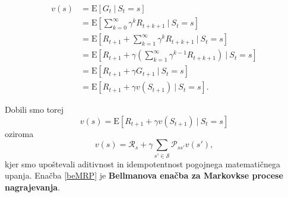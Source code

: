 \documentclass[12pt,a4paper]{amsart}
\theoremstyle{definition} %
\theoremstyle{plain} %
\begin{document}
\begin{align*}
    v(s) &= \mathrm{E} [G_t~|~S_t = s] \\
         &= \mathrm{E} [\sum_{k=0}^\infty \gamma^k R_{t + k + 1}~|~S_t = s] \\
         &= \mathrm{E} [R_{t+1} + \sum_{k=1}^\infty \gamma^k R_{t + k + 1}~|~S_t = s] \\
         &= \mathrm{E} [R_{t+1} + \gamma(\sum_{k=1}^\infty \gamma^{k-1} R_{t + k + 1})~|~S_t = s] \\
         &= \mathrm{E} [R_{t+1} + \gamma G_{t+1}~|~S_t = s] \\
         &= \mathrm{E} [R_{t+1} + \gamma v(S_{t+1})~|~S_t = s].
\end{align*}

Dobili smo torej 
$$
v(s) = \mathrm{E} [R_{t+1} + \gamma v(S_{t+1})~|~S_t = s]
$$
oziroma 
\begin{equation}\label{beMRP}
    v(s) = \mathcal{R}_s + \gamma \sum_{s' \in \mathcal{S}} \mathcal{P}_{ss'} v(s'),
\end{equation} 
kjer smo upoštevali aditivnost in idempotentnost pogojnega matematičnega upanja. Enačba \eqref{beMRP}
je \textbf{Bellmanova enačba za Markovkse procese nagrajevanja}.
\end{document}

